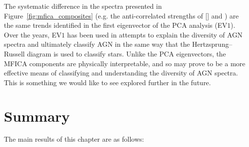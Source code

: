The systematic difference in the spectra presented in Figure~\ref{fig:mfica_composites} (e.g. the anti-correlated strengths of [] and ) are the same trends identified in the first eigenvector of the \citet{boroson92} PCA analysis (EV$1$). 
Over the years, EV$1$ has been used in attempts to explain the diversity of AGN spectra and ultimately classify AGN in the same way that the Hertzsprung–Russell diagram is used to classify stars.
Unlike the PCA eigenvectors, the MFICA components are physically interpretable, and so may prove to be a more effective means of classifying and understanding the diversity of AGN spectra. 
This is something we would like to see explored further in the future. 

\section{Summary}

The main results of this chapter are as follows: 

